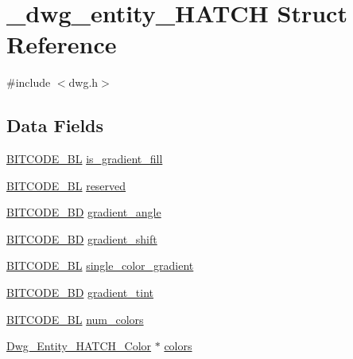 \hypertarget{struct__dwg__entity__HATCH}{\section{\-\_\-dwg\-\_\-entity\-\_\-\-H\-A\-T\-C\-H \-Struct \-Reference}
\label{struct__dwg__entity__HATCH}
}


{\ttfamily \#include $<$dwg.\-h$>$}

\subsection*{\-Data \-Fields}
\begin{DoxyCompactItemize}
\item 
\hyperlink{dwg_8h_aebd5f127038868cbabc3d55d91da776c}{\-B\-I\-T\-C\-O\-D\-E\-\_\-\-B\-L} \hyperlink{struct__dwg__entity__HATCH_adaa5aa2753143ed64db936f8469bda7a}{is\-\_\-gradient\-\_\-fill}
\item 
\hyperlink{dwg_8h_aebd5f127038868cbabc3d55d91da776c}{\-B\-I\-T\-C\-O\-D\-E\-\_\-\-B\-L} \hyperlink{struct__dwg__entity__HATCH_a59883dd01085c5aa5594864176fae1ca}{reserved}
\item 
\hyperlink{dwg_8h_a3c1e6781466b74ba07785d57da70ed97}{\-B\-I\-T\-C\-O\-D\-E\-\_\-\-B\-D} \hyperlink{struct__dwg__entity__HATCH_abcd0b37b0914ed43e58f3dca416ed5cd}{gradient\-\_\-angle}
\item 
\hyperlink{dwg_8h_a3c1e6781466b74ba07785d57da70ed97}{\-B\-I\-T\-C\-O\-D\-E\-\_\-\-B\-D} \hyperlink{struct__dwg__entity__HATCH_a181b5d1ad80d8b839188ae058da9104a}{gradient\-\_\-shift}
\item 
\hyperlink{dwg_8h_aebd5f127038868cbabc3d55d91da776c}{\-B\-I\-T\-C\-O\-D\-E\-\_\-\-B\-L} \hyperlink{struct__dwg__entity__HATCH_a37a145fcec807d7114ab2ea382a06602}{single\-\_\-color\-\_\-gradient}
\item 
\hyperlink{dwg_8h_a3c1e6781466b74ba07785d57da70ed97}{\-B\-I\-T\-C\-O\-D\-E\-\_\-\-B\-D} \hyperlink{struct__dwg__entity__HATCH_a160aaa1b5740f6f0a3d72d970dd8c7bd}{gradient\-\_\-tint}
\item 
\hyperlink{dwg_8h_aebd5f127038868cbabc3d55d91da776c}{\-B\-I\-T\-C\-O\-D\-E\-\_\-\-B\-L} \hyperlink{struct__dwg__entity__HATCH_af7c83bd712b720c7df47fbed9543cfba}{num\-\_\-colors}
\item 
\hyperlink{dwg_8h_a82a442f981370ca2697c3ef42c8baec4}{\-Dwg\-\_\-\-Entity\-\_\-\-H\-A\-T\-C\-H\-\_\-\-Color} $\ast$ \hyperlink{struct__dwg__entity__HATCH_ad3e5f294fc1887f1cd18dfa5aef325fe}{colors}

\end{DoxyCompactItemize}
